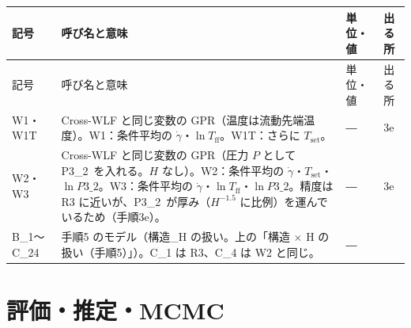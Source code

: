 \documentclass[paper=a4paper,fontsize=10.5pt,line_length=44zw,number_of_lines=38]{jlreq}
\makeatletter
\newcommand{\gd}{\dot{\gamma}}
\newcommand{\Tff}{T_{\mathrm{ff}}}
\newcommand{\Tset}{T_{\mathrm{set}}}
\newcommand{\PII}{P3\_2}
\newenvironment{symtab}{%
  \begin{longtable}{@{}>{\raggedright\arraybackslash}p{6.5\zw}>{\raggedright\arraybackslash}p{22\zw}>{\raggedright\arraybackslash}p{6\zw}>{\raggedright\arraybackslash}p{4.5\zw}@{}}
  \toprule 記号 & 呼び名と意味 & 単位・値 & 出る所 \\ \midrule \endfirsthead
  \toprule 記号 & 呼び名と意味 & 単位・値 & 出る所 \\ \midrule \endhead
  \bottomrule \endlastfoot}{\end{longtable}}
\makeatother
\begin{document}
\begin{symtab}
W1・W1T & Cross-WLF と同じ変数の GPR（温度は流動先端温度）。W1：条件平均の $\gd$・$\ln\Tff$。W1T：さらに $\Tset$。 & ― & 3e \\
W2・W3 & Cross-WLF と同じ変数の GPR（圧力 $P$ として \PII\ を入れる。$H$ なし）。W2：条件平均の $\gd$・$\Tset$・$\ln\PII$。W3：条件平均の $\gd$・$\ln\Tff$・$\ln\PII$。精度は R3 に近いが、\PII\ が厚み（$H^{-1.5}$ に比例）を運んでいるため（手順3e）。 & ― & 3e \\
B\_1〜C\_24 & 手順5 のモデル（構造\_H の扱い。上の「構造 $\times$ H の扱い（手順5）」）。C\_1 は R3、C\_4 は W2 と同じ。 & ― & 5 \\
\end{symtab}

\section{評価・推定・MCMC}
\end{document}
